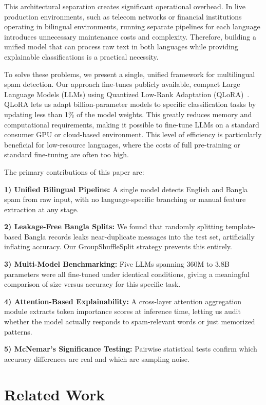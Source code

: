 \documentclass[journal]{IEEEtran}
\begin{document}
This architectural separation creates significant operational overhead. In live production environments, such as telecom networks or financial institutions operating in bilingual environments, running separate pipelines for each language introduces unnecessary maintenance costs and complexity. Therefore, building a unified model that can process raw text in both languages while providing explainable classifications is a practical necessity.

To solve these problems, we present a single, unified framework for multilingual spam detection. Our approach fine-tunes publicly available, compact Large Language Models (LLMs) using Quantized Low-Rank Adaptation (QLoRA)~\cite{ref11}. QLoRA lets us adapt billion-parameter models to specific classification tasks by updating less than 1\% of the model weights. This greatly reduces memory and computational requirements, making it possible to fine-tune LLMs on a standard consumer GPU or cloud-based environment. This level of efficiency is particularly beneficial for low-resource languages, where the costs of full pre-training or standard fine-tuning are often too high.

The primary contributions of this paper are:

\textbf{1) Unified Bilingual Pipeline:} A single model detects English and Bangla spam from raw input, with no language-specific branching or manual feature extraction at any stage.

\textbf{2) Leakage-Free Bangla Splits:} We found that randomly splitting template-based Bangla records leaks near-duplicate messages into the test set, artificially inflating accuracy. Our GroupShuffleSplit strategy prevents this entirely.

\textbf{3) Multi-Model Benchmarking:} Five LLMs spanning 360M to 3.8B parameters were all fine-tuned under identical conditions, giving a meaningful comparison of size versus accuracy for this specific task.

\textbf{4) Attention-Based Explainability:} A cross-layer attention aggregation module extracts token importance scores at inference time, letting us audit whether the model actually responds to spam-relevant words or just memorized patterns.

\textbf{5) McNemar's Significance Testing:} Pairwise statistical tests confirm which accuracy differences are real and which are sampling noise.

\section{Related Work}
\end{document}
